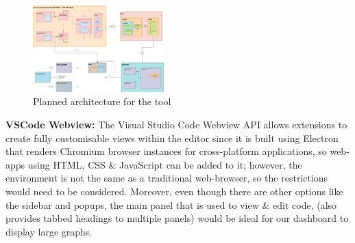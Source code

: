 \documentclass{prrcs}
\newcommand{\cmmnt}[1]{}
\begin{document}
\begin{figure}[h]
    \centering
    \includegraphics[width=0.45\textwidth]{architecture.pdf}
    \caption{Planned architecture for the tool}
\end{figure}

\textbf{VSCode Webview:} The Visual Studio Code Webview API allows extensions to create fully customisable views within the editor\cmmnt{\cite{WebviewAPI}} since it is built using Electron that renders Chromium browser instances for cross-platform applications, so web-apps using HTML, CSS \& JavaScript can be added to it\cmmnt{ (we would adhere to the VSCode UI)}; however, the environment is not the same as a traditional web-browser, so the restrictions would need to be considered. Moreover, even though there are other options like the sidebar and popups, the main panel that is used to view \& edit code, (also provides tabbed headings to multiple panels) would be ideal for our dashboard to display large graphs.
\end{document}
